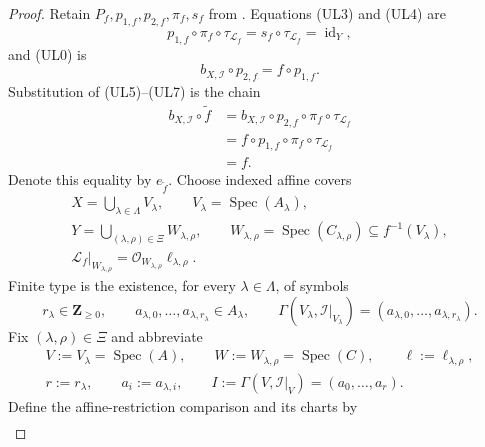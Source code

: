 \begin{proof}
  Retain $P_f,p_{1,f},p_{2,f},\pi_f,s_f$ from
  .  Equations (UL3) and (UL4) are
  \[
    p_{1,f}\circ\pi_f\circ\tau_{\mathcal L_f}
      =s_f\circ\tau_{\mathcal L_f}
      =\operatorname{id}_Y,                                  \tag{UL6}
  \]
  and (UL0) is
  \[
    b_{X,\mathcal I}\circ p_{2,f}=f\circ p_{1,f}.             \tag{UL7}
  \]
  Substitution of (UL5)--(UL7) is the chain
  \[
  \begin{aligned}
    b_{X,\mathcal I}\circ\widetilde f
      &=b_{X,\mathcal I}\circ p_{2,f}\circ\pi_f
        \circ\tau_{\mathcal L_f}\\
      &=f\circ p_{1,f}\circ\pi_f\circ\tau_{\mathcal L_f}\\
      &=f.
  \end{aligned}
  \]
  Denote this equality by $e_{\widetilde f}$.  Choose indexed affine covers
  \[
  \begin{gathered}
    X=\bigcup_{\lambda\in\Lambda}V_\lambda,\qquad
    V_\lambda=\operatorname{Spec}(A_\lambda),\\
    Y=\bigcup_{(\lambda,\rho)\in\Xi}W_{\lambda,\rho},\qquad
    W_{\lambda,\rho}=\operatorname{Spec}(C_{\lambda,\rho})
      \subseteq f^{-1}(V_\lambda),\\
    \mathcal L_f|_{W_{\lambda,\rho}}
      =\mathcal O_{W_{\lambda,\rho}}\ell_{\lambda,\rho}.
  \end{gathered}                                               \tag{UL7a}
  \]
  Finite type is the existence, for every $\lambda\in\Lambda$, of symbols
  \[
    r_\lambda\in\mathbf Z_{\ge0},\qquad
    a_{\lambda,0},\ldots,a_{\lambda,r_\lambda}\in A_\lambda,
    \qquad
    \Gamma(V_\lambda,\mathcal I|_{V_\lambda})
      =(a_{\lambda,0},\ldots,a_{\lambda,r_\lambda}).           \tag{UL7b}
  \]
  Fix $(\lambda,\rho)\in\Xi$ and abbreviate
  \[
  \begin{gathered}
    V:=V_\lambda=\operatorname{Spec}(A),\qquad
    W:=W_{\lambda,\rho}=\operatorname{Spec}(C),\qquad
    \ell:=\ell_{\lambda,\rho},\\
    r:=r_\lambda,\qquad a_i:=a_{\lambda,i},\qquad
    I:=\Gamma(V,\mathcal I|_V)=(a_0,\ldots,a_r).
  \end{gathered}                                               \tag{UL7c}
  \]
  Define the affine-restriction comparison and its charts by
  \[
  \begin{gathered}

\end{gathered}\]
\end{proof}
